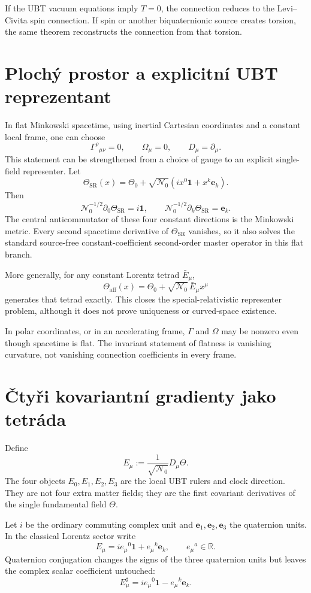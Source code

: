 If the UBT vacuum equations imply $T=0$, the connection reduces to the
Levi--Civita spin connection.  If spin or another biquaternionic source creates
torsion, the same theorem reconstructs the connection from that torsion.

\section{Plochý prostor a explicitní UBT reprezentant}
In flat Minkowski spacetime, using inertial Cartesian coordinates and a constant
local frame, one can choose
\[
 \Gamma^\rho{}_{\mu\nu}=0,
 \qquad \Omega_\mu=0,
 \qquad D_\mu=\partial_\mu.
\]
This statement can be strengthened from a choice of gauge to an explicit
single-field representer.  Let
\[
 \boxed{
 \Theta_{\mathrm{SR}}(x)=\Theta_0+\sqrt{\mathcal N_0}
 \left(i x^0\mathbf1+x^k\mathbf e_k\right).}
\]
Then
\[
 \mathcal N_0^{-1/2}\partial_0\Theta_{\mathrm{SR}}=i\mathbf1,
 \qquad
 \mathcal N_0^{-1/2}\partial_k\Theta_{\mathrm{SR}}=\mathbf e_k.
\]
The central anticommutator of these four constant directions is the Minkowski
metric.  Every second spacetime derivative of $\Theta_{\mathrm{SR}}$ vanishes,
so it also solves the standard source-free constant-coefficient second-order
master operator in this flat branch.

More generally, for any constant Lorentz tetrad $\bar E_\mu$,
\[
 \Theta_{\mathrm{aff}}(x)=\Theta_0+
 \sqrt{\mathcal N_0}\,\bar E_\mu x^\mu
\]
generates that tetrad exactly.  This closes the special-relativistic
representer problem, although it does not prove uniqueness or curved-space
existence.

In polar coordinates, or in an accelerating frame, $\Gamma$ and $\Omega$ may
be nonzero even though spacetime is flat.  The invariant statement of flatness
is vanishing curvature, not vanishing connection coefficients in every frame.

\section{Čtyři kovariantní gradienty jako tetráda}
Define
\[
 E_\mu:=\frac{1}{\sqrt{\mathcal N_0}}D_\mu\Theta.
\]
The four objects $E_0,E_1,E_2,E_3$ are the local UBT rulers and clock direction.
They are not four extra matter fields; they are the first covariant derivatives
of the single fundamental field $\Theta$.

Let $i$ be the ordinary commuting complex unit and
$\mathbf e_1,\mathbf e_2,\mathbf e_3$ the quaternion units.  In the classical
Lorentz sector write
\[
 E_\mu=i e_\mu{}^0\mathbf1+e_\mu{}^k\mathbf e_k,
 \qquad e_\mu{}^a\in\mathbb R.
\]
Quaternion conjugation changes the signs of the three quaternion units but
leaves the complex scalar coefficient untouched:
\[
 E_\mu^\sharp=i e_\mu{}^0\mathbf1-e_\mu{}^k\mathbf e_k.
\]

